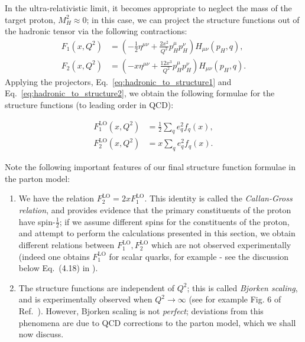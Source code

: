 \documentclass[withindex,glossary]{cam-thesis}
\begin{document}
In the ultra-relativistic limit, it becomes appropriate to neglect the mass of the target proton, $M_H^2 \approx 0$; in this case, we can project the structure functions out of the hadronic tensor via the following contractions:
\begin{align}
\label{eq:hadronic_to_structure1}
F_1(x,Q^2) &=\left( -\frac{1}{2} \eta^{\mu\nu} + \frac{2x^2}{Q^2} p_H^{\mu} p_H^{\nu} \right) H_{\mu\nu} (p_H, q), \\[1.5ex]
\label{eq:hadronic_to_structure2}
F_2(x,Q^2) &= \left( - x \eta^{\mu\nu} + \frac{12x^3}{Q^2} p_H^{\mu} p_H^{\nu} \right) H_{\mu\nu}(p_H, q).
\end{align}
Applying the projectors, Eq.~\eqref{eq:hadronic_to_structure1} and Eq.~\eqref{eq:hadronic_to_structure2}, we obtain the following formulae for the structure functions (to leading order in QCD):
\begin{framed}
\begin{align}
F_1^{\text{LO}}(x,Q^2) &= \frac{1}{2}\sum_{q} e_q^2 f_q(x), \\[1.5ex]
F_2^{\text{LO}}(x,Q^2) &= x \sum_{q} e_q^2 f_q(x).
\end{align}
\end{framed}
Note the following important features of our final structure function formulae in the parton model:
\begin{enumerate}[label = (\arabic*)]
\item We have the relation $F_2^{\text{LO}} = 2x F_1^{\text{LO}}$. This identity is called the \textit{Callan-Gross relation}, and provides evidence that the primary constituents of the proton have spin-$\frac{1}{2}$; if we assume different spins for the constituents of the proton, and attempt to perform the calculations presented in this section, we obtain different relations between $F_1^{\text{LO}}, F_2^{\text{LO}}$ which are not observed experimentally (indeed one obtains $F_1^{\text{LO}}$ for scalar quarks, for example - see the discussion below Eq.~(4.18) in \cite{Ellis:1996mzs}).
\item The structure functions are independent of $Q^2$; this is called \textit{Bjorken scaling}, and is experimentally observed when $Q^2 \rightarrow \infty$ (see for example Fig. 6 of Ref.~\cite{Martin:1994kn}). However, Bjorken scaling is not \textit{perfect}; deviations from this phenomena are due to QCD corrections to the parton model, which we shall now discuss.
\end{enumerate}
\end{document}
